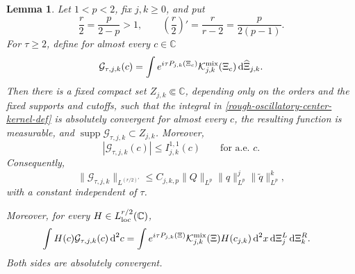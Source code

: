 \documentclass[a4paper,11pt]{article}
\newcommand{\C}{\mathbb{C}}
\newcommand{\dd}{\,\text{d}}
\theoremstyle{plain}
\newtheorem{lem}[thm]{Lemma}
\theoremstyle{definition}
\theoremstyle{remark}
\begin{document}
\begin{lem}
\label{lem-rough-oscillatory-center-kernel}
Let $1<p<2$, fix $j,k\geq0$, and put
\begin{equation}\label{product-duality-exponents}
 \frac r2=\frac{p}{2-p}>1,
 \qquad
 \left(\frac r2\right)'=\frac{r}{r-2}
     =\frac{p}{2(p-1)}.
\end{equation}
For $\tau\geq2$, define for almost every $c\in\C$
\begin{equation}\label{rough-oscillatory-center-kernel-def}
 \mathcal G_{\tau,j,k}(c)
 =\int
   e^{i\tau P_{j,k}(\Xi_c)}
   \mathcal K_{j,k}^{\rm mix}(\Xi_c)
   \dd\widehat\Xi_{j,k}.
\end{equation}
Then there is a fixed compact set $Z_{j,k}\Subset\C$, depending only on
the orders and the fixed supports and cutoffs, such that the integral in
\eqref{rough-oscillatory-center-kernel-def} is absolutely convergent for
almost every $c$, the resulting function is measurable, and
$\operatorname{supp}\mathcal G_{\tau,j,k}\subset Z_{j,k}$.  Moreover,
\begin{equation}\label{rough-center-kernel-pointwise-bound}
 |\mathcal G_{\tau,j,k}(c)|\leq I_{j,k}^{1,1}(c)
 \qquad\text{for a.e. }c.
\end{equation}
Consequently,
\begin{equation}\label{rough-center-kernel-Lmprime}
 \|\mathcal G_{\tau,j,k}\|_{L^{(r/2)'}}
 \leq C_{j,k,p}
 \|Q\|_{L^p}\|q\|_{L^p}^j
 \|\widetilde q\|_{L^p}^k,
\end{equation}
with a constant independent of $\tau$.

Moreover, for every $H\in L^{r/2}_{\rm loc}(\C)$,
\begin{align}
 \int H(c)\mathcal G_{\tau,j,k}(c)\dd^2c
 &=\int e^{i\tau P_{j,k}(\Xi)}
   \mathcal K_{j,k}^{\rm mix}(\Xi)
   H(c_{j,k})
   \dd^2x\dd\Xi_j^L\dd\Xi_k^R.
 \label{rough-center-kernel-pairing}
\end{align}
Both sides are absolutely convergent.
\end{lem}
\end{document}
